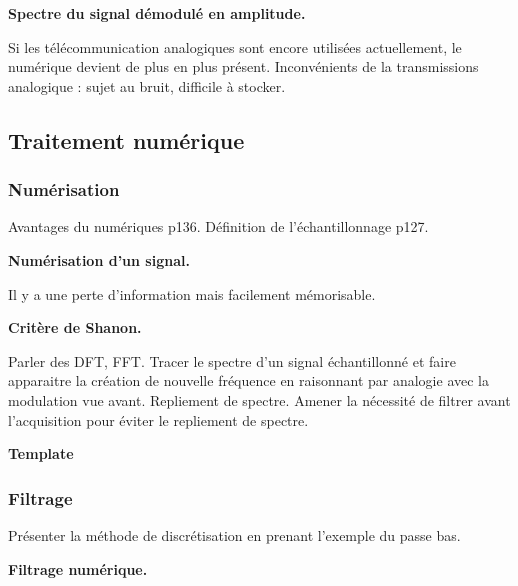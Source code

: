 \begin{slide}
\textbf{Spectre du signal démodulé en amplitude.}
\end{slide}

\begin{transition}
Si les télécommunication analogiques sont encore utilisées actuellement, le numérique devient de plus en plus présent.
Inconvénients de la transmissions analogique : sujet au bruit, difficile à stocker.
\end{transition}

\subsection{Traitement numérique}

\subsubsection{Numérisation}

Avantages du numériques \cite{Cardini2017} p136.
Définition de l'échantillonnage \cite{Cardini2017} p127.

\begin{slide}
\textbf{Numérisation d'un signal.}
\end{slide}

Il y a une perte d'information mais facilement mémorisable.

\begin{slide}
\textbf{Critère de Shanon.}
\end{slide}
Parler des DFT, FFT.
Tracer le spectre d'un signal échantillonné et faire apparaitre la création de nouvelle fréquence en raisonnant par analogie avec la modulation vue avant.
Repliement de spectre.
Amener la nécessité de filtrer avant l'acquisition pour éviter le repliement de spectre.

\begin{transition}
\textbf{Template}
\end{transition}

\subsubsection{Filtrage}

Présenter la méthode de discrétisation en prenant l'exemple du passe bas.

\begin{slide}
\textbf{Filtrage numérique.}
\end{slide}

